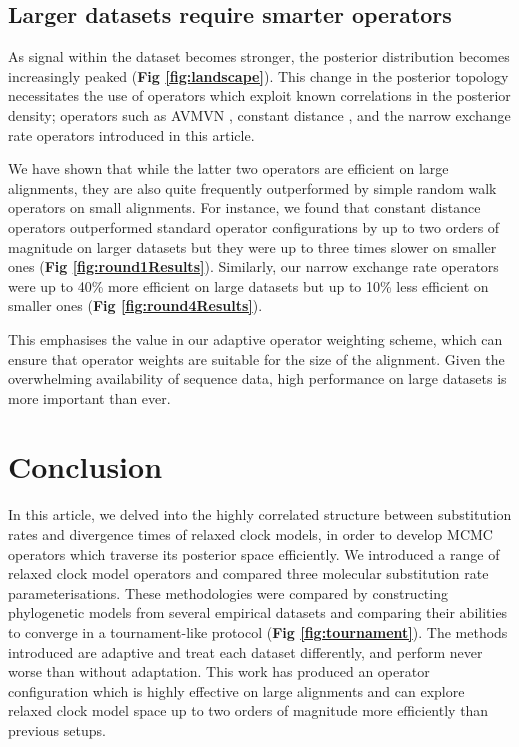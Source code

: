 \documentclass[10pt,letterpaper]{article}
\begin{document}
	
	
\subsection*{Larger datasets require smarter operators}

As signal within the dataset becomes stronger, the posterior distribution becomes increasingly peaked (\textbf{Fig \ref{fig:landscape}}).
This change in the posterior topology necessitates the use of operators which exploit known correlations in the posterior density; operators such as AVMVN \cite{baele2017adaptive}, constant distance \cite{zhang2020improving}, and the narrow exchange rate operators introduced in this article.

We have shown that while the latter two operators are efficient on large alignments, they are also quite frequently outperformed by simple random walk operators on small alignments.
For instance, we found that constant distance operators outperformed standard operator configurations by up to two orders of magnitude on larger datasets but they were up to three times slower on smaller ones (\textbf{Fig \ref{fig:round1Results}}). 
Similarly, our narrow exchange rate operators were up to 40\% more efficient on large datasets but up to 10\% less efficient on smaller ones (\textbf{Fig \ref{fig:round4Results}}).

This emphasises the value in our adaptive operator weighting scheme, which can ensure that operator weights are suitable for the size of the alignment.
Given the overwhelming availability of sequence data, high performance on large datasets is more important than ever.



\section*{Conclusion}

In this article, we delved into the highly correlated structure between substitution rates and divergence times of relaxed clock models, in order to develop MCMC operators which traverse its posterior space efficiently.
We introduced a range of relaxed clock model operators and compared three molecular substitution rate parameterisations.
These methodologies were compared by constructing phylogenetic models from several empirical datasets and comparing their abilities to converge in a tournament-like protocol (\textbf{Fig \ref{fig:tournament}}).
The methods introduced are adaptive and treat each dataset differently, and perform never worse than without adaptation. %
This work has produced an operator configuration which is highly effective  on large alignments and can explore relaxed clock model space up to two orders of magnitude more efficiently than previous setups.
\end{document}
